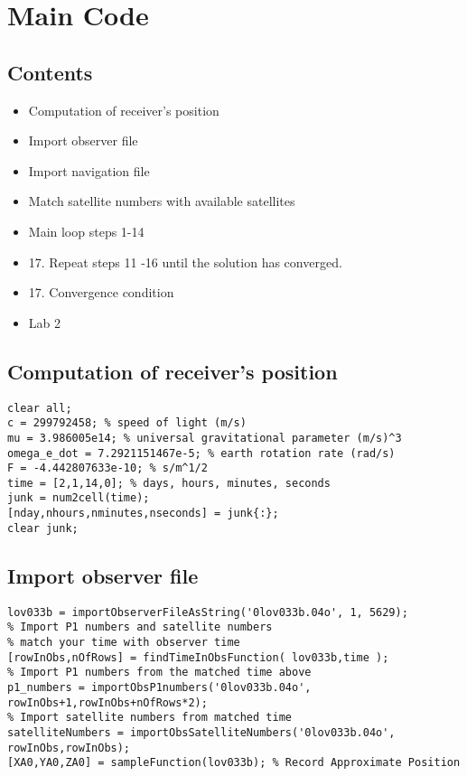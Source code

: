 \section{Main Code} %
\label{sec:main_code}

\subsection*{Contents}

\begin{itemize}
\setlength{\itemsep}{-1ex}
   \item Computation of receiver's position
   \item Import observer file
   \item Import navigation file
   \item Match satellite numbers with available satellites
   \item Main loop steps 1-14
   \item 17. Repeat steps 11 -16 until the solution has converged.
   \item 17. Convergence condition
   \item Lab 2
\end{itemize}


\subsection*{Computation of receiver's position}

\begin{verbatim}
clear all;
c = 299792458; % speed of light (m/s)
mu = 3.986005e14; % universal gravitational parameter (m/s)^3
omega_e_dot = 7.2921151467e-5; % earth rotation rate (rad/s)
F = -4.442807633e-10; % s/m^1/2
time = [2,1,14,0]; % days, hours, minutes, seconds
junk = num2cell(time);
[nday,nhours,nminutes,nseconds] = junk{:};
clear junk;
\end{verbatim}


\subsection*{Import observer file}

\begin{verbatim}
lov033b = importObserverFileAsString('0lov033b.04o', 1, 5629);
% Import P1 numbers and satellite numbers
% match your time with observer time
[rowInObs,nOfRows] = findTimeInObsFunction( lov033b,time ); 
% Import P1 numbers from the matched time above
p1_numbers = importObsP1numbers('0lov033b.04o', rowInObs+1,rowInObs+nOfRows*2); 
% Import satellite numbers from matched time
satelliteNumbers = importObsSatelliteNumbers('0lov033b.04o', rowInObs,rowInObs); 
[XA0,YA0,ZA0] = sampleFunction(lov033b); % Record Approximate Position
\end{verbatim}


